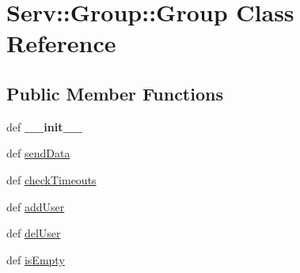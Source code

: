 \hypertarget{class_serv_1_1_group_1_1_group}{
\section{Serv::Group::Group Class Reference}
\label{class_serv_1_1_group_1_1_group}
}
\subsection*{Public Member Functions}
\begin{CompactItemize}
\item 
\hypertarget{class_serv_1_1_group_1_1_group_ee5bd24c2c39d9c06c11aec410690c3d}{
def \textbf{\_\-\_\-init\_\-\_\-}}
\label{class_serv_1_1_group_1_1_group_ee5bd24c2c39d9c06c11aec410690c3d}

\item 
def \hyperlink{class_serv_1_1_group_1_1_group_cbb0137781676208d4de16b90d8d9cc0}{sendData}
\item 
def \hyperlink{class_serv_1_1_group_1_1_group_ff52dadf0f67e54340f9602cc3a6fbba}{checkTimeouts}
\item 
def \hyperlink{class_serv_1_1_group_1_1_group_0a4183d2362794bd55741a35e4b5a91d}{addUser}
\item 
def \hyperlink{class_serv_1_1_group_1_1_group_48768b6b5440e56d42d632085b2a8aef}{delUser}
\item 
def \hyperlink{class_serv_1_1_group_1_1_group_51e7ce8393ee398260d4e12e904da5ab}{isEmpty}
\end{CompactItemize}
